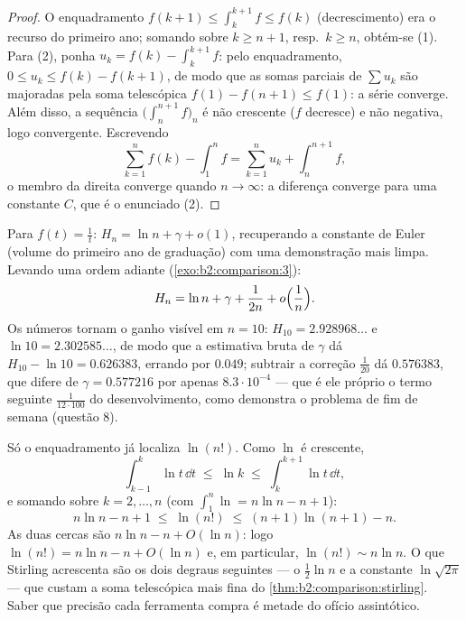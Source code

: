 \begin{proof}
O enquadramento $f(k+1) \leq \int_k^{k+1} f \leq f(k)$ (decrescimento) era
o recurso do primeiro ano; somando sobre $k \geq n+1$, resp.\ $k \geq n$,
obtém-se (1). Para (2), ponha $u_k = f(k) - \int_k^{k+1} f$: pelo
enquadramento, $0 \leq u_k \leq f(k) - f(k+1)$, de modo que as somas parciais de
$\sum u_k$ são majoradas pela soma telescópica $f(1) - f(n+1) \leq
f(1)$: a série converge. Além disso, a sequência $\bigl(\int_n^{n+1}
f\bigr)_n$ é não crescente ($f$ decresce) e não negativa, logo
convergente. Escrevendo
\[
\sum_{k=1}^{n} f(k) - \int_1^n f
= \sum_{k=1}^{n} u_k + \int_n^{n+1} f ,
\]
o membro da direita converge quando $n \to \infty$: a diferença converge
para uma constante $C$, que é o enunciado (2).
\end{proof}

\begin{example}\label{ex:b2:comparison:harmonic}
Para $f(t) = \frac1t$: $H_n = \ln n + \gamma + o(1)$, recuperando
a constante de Euler (volume do primeiro ano de graduação) com uma demonstração mais limpa. Levando uma
ordem adiante (\cref{exo:b2:comparison:3}):
\[
H_n = \ln n + \gamma + \frac{1}{2n} + o\Bigl(\frac1n\Bigr).
\]
Os números tornam o ganho visível em $n = 10$: $H_{10} =
2.928968\dots$ e $\ln 10 = 2.302585\dots$, de modo que a estimativa
bruta de $\gamma$ dá $H_{10} - \ln 10 = 0.626383$, errando por $0.049$;
subtrair a correção $\frac1{20}$ dá $0.576383$,
que difere de $\gamma = 0.577216$ por apenas $8.3\cdot10^{-4}$ ---
que é ele próprio o termo seguinte $\frac{1}{12\cdot100}$ do
desenvolvimento, como demonstra o problema de fim de semana (questão 8).
\end{example}

\begin{example}\label{ex:b2:comparison:lnfactorial}
Só o enquadramento já localiza $\ln(n!)$. Como
$\ln$ é crescente,
\[
\int_{k-1}^{k}\ln t\,\dd t \;\leq\; \ln k \;\leq\;
\int_{k}^{k+1}\ln t\,\dd t ,
\]
e somando sobre $k = 2, \dots, n$ (com $\int_1^n\ln = n\ln n
- n + 1$):
\[
n\ln n - n + 1 \;\leq\; \ln(n!) \;\leq\; (n+1)\ln(n+1) - n .
\]
As duas cercas são $n\ln n - n + O(\ln n)$: logo $\ln(n!) = n\ln
n - n + O(\ln n)$ e, em particular, $\ln(n!) \sim n\ln n$.
O que Stirling acrescenta são os dois degraus seguintes --- o $\frac12\ln n$
e a constante $\ln\sqrt{2\pi}$ --- que custam a soma telescópica mais fina do
\cref{thm:b2:comparison:stirling}. Saber
que precisão cada ferramenta compra é metade do ofício assintótico.
\end{example}


